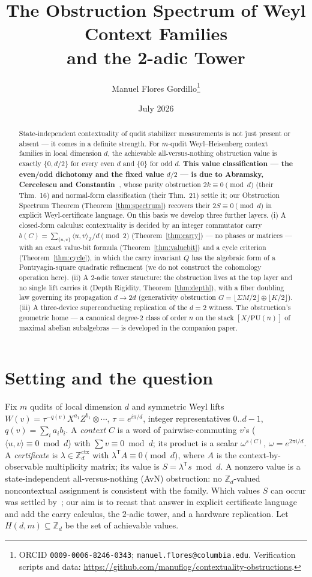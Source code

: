 \documentclass[11pt]{article}
\title{The Obstruction Spectrum of Weyl Context Families\\ and the 2-adic Tower}
\author{Manuel Flores Gordillo\thanks{ORCID \texttt{0009-0006-8246-0343};
\texttt{manuel.flores@columbia.edu}. Verification scripts and data:
\url{https://github.com/manuflog/contextuality-obstructions}.}}
\date{July 2026}
\theoremstyle{remark}
\newcommand{\Z}{\mathbb{Z}}
\newcommand{\ip}[2]{\langle #1,#2\rangle}
\newcommand{\ipz}[2]{\langle #1,#2\rangle_{\Z}}
\begin{document}
\maketitle

\begin{abstract}
State-independent contextuality of qudit stabilizer measurements is not just present or absent --- it
comes in a definite strength. For $m$-qudit Weyl--Heisenberg context families in local dimension $d$,
the achievable all-versus-nothing obstruction value is exactly $\{0,d/2\}$ for every even $d$ and
$\{0\}$ for odd $d$. \textbf{This value classification --- the even/odd dichotomy and the fixed value
$d/2$ --- is due to Abramsky, Cercelescu and Constantin~\cite{ACC24}}, whose parity obstruction
$2k\equiv 0\pmod d$ (their Thm.~16) and normal-form classification (their Thm.~21) settle it; our
Obstruction Spectrum Theorem (Theorem~\ref{thm:spectrum}) recovers their $2S\equiv 0\pmod d$ in
explicit Weyl-certificate language. On this basis we develop three further layers. (i) A closed-form
calculus: contextuality is decided by an integer commutator carry
$b(C)=\sum_{\{u,v\}}\ipz{u}{v}/d \pmod 2$ (Theorem~\ref{thm:carry}) --- no phases or matrices --- with
an exact value-bit formula (Theorem~\ref{thm:valuebit}) and a cycle criterion
(Theorem~\ref{thm:cycle}), in which the carry invariant $Q$ has the algebraic form of a
Pontryagin-square quadratic refinement (we do not construct the cohomology operation here).
(ii) A $2$-adic tower structure: the obstruction lives at the top layer and no single lift carries it
(Depth Rigidity, Theorem~\ref{thm:depth}), with a fiber doubling law governing its propagation
$d\to 2d$ (generativity obstruction $G=\lfloor\Sigma M/2\rfloor\oplus\lfloor K/2\rfloor$).
(iii) A three-device superconducting replication of the $d=2$ witness. The obstruction's geometric
home --- a canonical degree-$2$ class of order $n$ on the stack $[X/\mathrm{PU}(n)]$ of maximal
abelian subalgebras --- is developed in the companion paper.
\end{abstract}

\section{Setting and the question}
Fix $m$ qudits of local dimension $d$ and symmetric Weyl lifts
$W(v)=\tau^{-q(v)}X^{a_1}Z^{b_1}\otimes\cdots$, $\tau=e^{i\pi/d}$, integer representatives $0..d-1$,
$q(v)=\sum_i a_ib_i$. A \emph{context} $C$ is a word of pairwise-commuting $v$'s
($\ip{u}{v}\equiv 0 \bmod d$) with $\sum v\equiv 0 \bmod d$; its product is a scalar $\omega^{s(C)}$,
$\omega=e^{2\pi i/d}$. A \emph{certificate} is $\lambda\in\Z_d^{\mathrm{ctx}}$ with
$\lambda^{\mathsf T}A\equiv 0\pmod d$, where $A$ is the context-by-observable multiplicity matrix; its
value is $S=\lambda^{\mathsf T}s\bmod d$. A nonzero value is a state-independent all-versus-nothing
(AvN) obstruction: no $\Z_d$-valued noncontextual assignment is consistent with the family. Which values $S$ can occur was settled by~\cite{ACC24}; our aim is to recast that answer in explicit
certificate language and add the carry calculus, the $2$-adic tower, and a hardware replication. Let
$H(d,m)\subseteq\Z_d$ be the set of achievable values.
\end{document}
